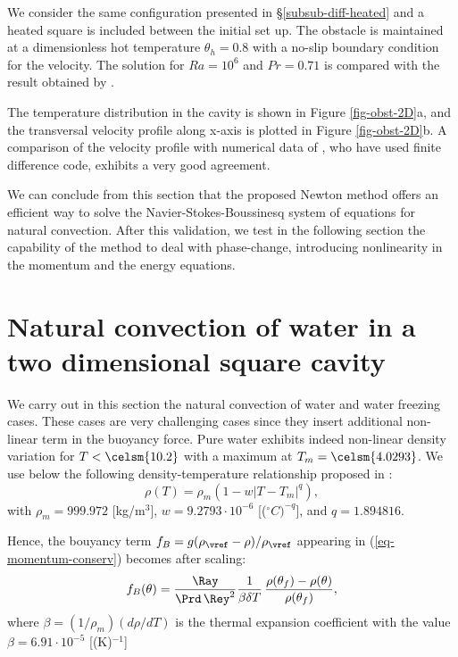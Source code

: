 We consider the same configuration presented in \S \ref{subsub-diff-heated} and a heated square is included between the initial set up.
The obstacle is maintained at a dimensionless hot temperature $\theta_h = 0.8$ with a no-slip boundary condition for the velocity.
The solution for $Ra = 10^6$ and $Pr = 0.71$ is compared with the result obtained by \cite{Raluca2013}.

The temperature distribution in the cavity is shown in Figure \ref{fig-obst-2D}a, and the transversal velocity profile along x-axis is plotted in Figure \ref{fig-obst-2D}b. 
A comparison of the velocity profile with numerical data of  \cite{Raluca2013}, who have used finite difference code, exhibits a very good agreement.

We can conclude from this section that the proposed Newton method offers an efficient way to solve the Navier-Stokes-Boussinesq system of equations for natural convection. After this validation, we test in the following section the capability of the method to deal with phase-change, introducing nonlinearity in the momentum and the energy equations.

\section{Natural convection of water in a two dimensional square cavity}\label{sec: natconv-water}
We carry out in this section the natural convection of water and water freezing cases. These cases are very challenging cases since they insert additional non-linear term in the buoyancy force.
Pure water exhibits indeed non-linear density variation for $T< \celsm{10.2}$ with a maximum at $T_m= \celsm{4.0293}$. We use below the following density-temperature relationship  proposed in \cite{Gebhart1977}:
\begin{equation}
\rho(T)=\rho_m \left(1 - w \left|T - T_m\right|^q\right),
\end{equation}
with $\rho_m=999.972$ [kg/m$^3$], $w=9.2793\cdot 10^{-6}$ [($^\circ C)^{-q}$], and $q=1.894816$.

Hence, the bouyancy term $f_B = g(\rho_\vref-\rho)/\rho_\vref$ appearing in (\ref{eq-momentum-conserv})  becomes after scaling:
\begin{equation}
f_B(\theta) = \frac{\Ray}{\Prd \, \Rey^2} \frac{1}{\beta \delta T}\, \frac{\rho(\theta_f)-\rho(\theta)}{\rho(\theta_f)},
\label{eq-fBnonlin}
\end{equation}
where $\beta=(1/\rho_m) \left(d\rho/dT\right)$ is the thermal expansion coefficient with the value \cite{Scanlon2004} $\beta=6.91 \cdot 10^{-5}$ [(K)$^{-1}$]

